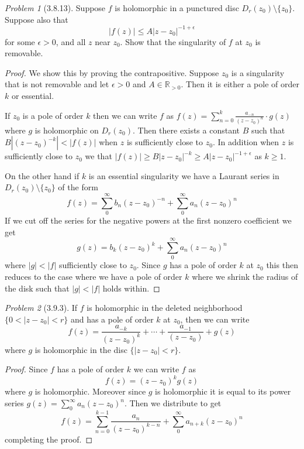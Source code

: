 \documentclass[10pt]{article}
\newcommand{\sk}{\vskip 10mm}
\newcommand{\bb}[1]{\mathbb{#1}}
\theoremstyle{remark}
\newtheorem{problem}{Problem}
\theoremstyle{remark}
\begin{document}
\sk

\begin{problem}[3.8.13]
  Suppose $f$ is holomorphic in a punctured disc $D_r(z_0)\setminus\{z_0\}$.
  Suppose also that
  \[
    |f(z)|\leq A|z-z_0|^{-1+\epsilon}
  \]
  for some $\epsilon>0$, and all $z$ near $z_0$. Show that the singularity
  of $f$ at $z_0$ is removable.
\end{problem}

\begin{proof}
  We show this by proving the contrapositive. Suppose $z_0$ is a singularity
  that is not removable and let $\epsilon>0$ and $A\in\bb{R}_{>0}$.
  Then it is either a pole of order $k$ or essential.

  If $z_0$ is a pole of order $k$ then we can write $f$ as
  $f(z)=\sum_{n=0}^k\frac{a_{-n}}{(z-z_0)^{n}}\cdot g(z)$ where $g$ is holomorphic on
  $D_r(z_0)$. Then there exists a constant $B$ such that $B|(z-z_0)^{-k}|<|f(z)|$
  when $z$ is sufficiently close to $z_0$. In addition when $z$ is sufficiently
  close to $z_0$ we that $|f(z)|\geq B|z-z_0|^{-k}\geq A|z-z_0|^{-1+\epsilon}$ as $k\geq 1$.

  On the other hand if $k$ is an essential singularity we have a Laurant
  series in $D_r(z_0)\setminus\{z_0\}$ of the form
  \[
    f(z)=\sum_0^\infty b_n(z-z_0)^{-n} +\sum_0^\infty a_n(z-z_0)^n
  \]
  If we cut off the series for the negative powers at the first nonzero coefficient
  we get
  \[
    g(z)=b_k(z-z_0)^k+\sum_0^\infty a_n(z-z_0)^n
  \]
  where $|g|<|f|$ sufficiently close to $z_0$. Since $g$ has a pole of order $k$
  at $z_0$ this then reduces to the case where we have a pole of order $k$ where
  we shrink the radius of the disk such that $|g|<|f|$ holds within.
\end{proof}

\sk

\begin{problem}[3.9.3]
  If $f$ is holomorphic in the deleted neighborhood $\{0<|z-z_0|<r\}$ and has a
  pole of order $k$ at $z_0$, then we can write
  \[
    f(z)=\frac{a_{-k}}{(z-z_0)^k}+\cdots + \frac{a_{-1}}{(z-z_0)} +g(z)
  \]
  where $g$ is holomorphic in the disc $\{|z-z_0|<r\}$.
\end{problem}

\begin{proof}
  Since $f$ has a pole of order $k$ we can write $f$ as
  \[
    f(z)=(z-z_0)^k g(z)
  \]
  where $g$ is holomorphic. Moreover since $g$ is holomorphic it is equal
  to its power series $g(z)=\sum_0^\infty a_n(z-z_0)^n$. Then we distribute to get
  \[
    f(z)=\sum_{n=0}^{k-1}\frac{a_n}{(z-z_0)^{k-n}}+\sum_0^\infty a_{n+k}(z-z_0)^n
  \]
  completing the proof.
\end{proof}

\end{document}

